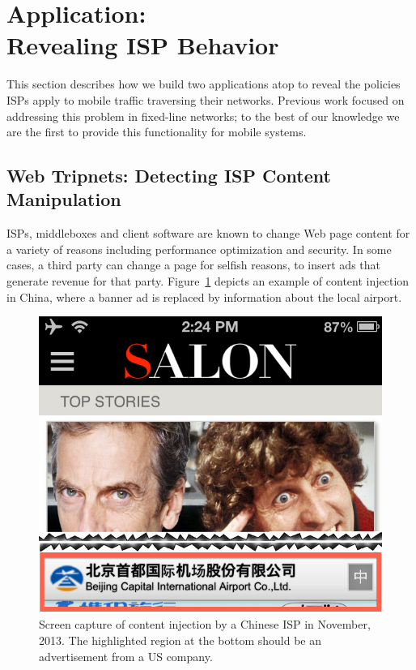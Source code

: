 \section{Application: \\
Revealing ISP Behavior}
\label{sec:isp-behavior}

This section describes how we build two applications atop \meddle to 
reveal the policies ISPs apply to mobile traffic traversing their networks. 
Previous work focused on addressing this problem in fixed-line networks; to 
the best of our knowledge we are the first to provide this functionality for 
mobile systems.

\subsection{Web Tripnets: Detecting ISP Content Manipulation}

ISPs, middleboxes and client software are known to change Web page content for 
a variety of reasons including performance optimization and security. In some cases, 
a third party can change a page for selfish reasons, \eg to insert ads that generate revenue 
for that party. Figure~\ref{fig:tripnet-example} depicts an example of content injection in China, where 
a banner ad is replaced by information about the local airport.

\begin{figure}
\centering
\includegraphics[width=0.9\linewidth]{figures/injectioncrop.png}
\caption{Screen capture of content injection by a Chinese ISP in November, 2013. The 
highlighted region at the bottom should be an advertisement from a US company. }
\label{fig:tripnet-example}
\end{figure}


